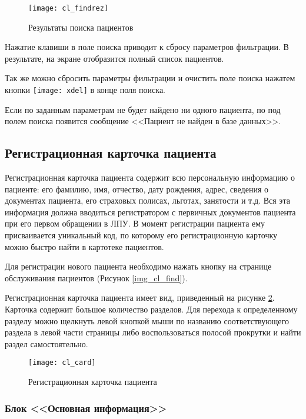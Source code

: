 \begin{figure}[ht]\centering
 \texttt{[image: cl\_findrez]}
 \caption{Результаты поиска пациентов}
 \label{img_cl_findrez}
\end{figure} 

\begin{vnim}
Нажатие клавиши  в поле поиска приводит к сбросу параметров фильтрации. В результате, на экране отобразится полный список пациентов.
\end{vnim}

Так же можно сбросить параметры фильтрации и очистить поле поиска нажатем кнопки \texttt{[image: xdel]} в конце поля поиска.

Если по заданным параметрам не будет найдено ни одного пациента, по под полем поиска появится сообщение <<Пациент не найден в базе данных>>.

\subsection{Регистрационная карточка пациента} \label{cl_card}

Регистрационная карточка пациента содержит всю персональную информацию о пациенте: его фамилию, имя, отчество, дату рождения, адрес, сведения о документах пациента, его страховых полисах, льготах, занятости и т.д. Вся эта информация должна вводиться регистратором с первичных документов пациента при его первом обращении в ЛПУ. В момент регистрации пациента ему присваивается уникальный код, по которому его регистрационную карточку можно быстро найти в картотеке пациентов.

Для регистрации нового пациента необходимо нажать  кнопку  на странице обслуживания пациентов (Рисунок \ref{img_cl_find}). 

Регистрационная карточка пациента имеет вид, приведенный на рисунке \ref{img_cl_card}. Карточка содержит большое количество разделов. Для перехода к определенному разделу можно щелкнуть левой кнопкой мыши по названию соответствующего раздела в левой части страницы либо воспользоваться полосой прокрутки и найти раздел самостоятельно.  

\begin{figure}[!ht]\centering
 \texttt{[image: cl\_card]}
 \caption{Регистрационная карточка пациента}
 \label{img_cl_card}
\end{figure} 

\subsubsection{Блок <<Основная информация>>}

